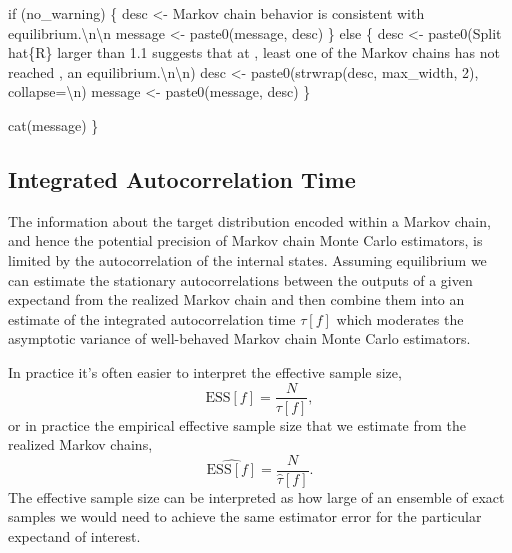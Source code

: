 \documentclass[
  letterpaper,
  DIV=11,
  numbers=noendperiod]{scrartcl}
\newenvironment{Shaded}{\begin{snugshade}}{\end{snugshade}}
\newcommand{\CharTok}[1]{\textcolor[rgb]{0.13,0.47,0.30}{#1}}
\newcommand{\ControlFlowTok}[1]{\textcolor[rgb]{0.00,0.23,0.31}{#1}}
\newcommand{\DecValTok}[1]{\textcolor[rgb]{0.68,0.00,0.00}{#1}}
\newcommand{\NormalTok}[1]{\textcolor[rgb]{0.00,0.23,0.31}{#1}}
\newcommand{\OperatorTok}[1]{\textcolor[rgb]{0.37,0.37,0.37}{#1}}
\newcommand{\SpecialCharTok}[1]{\textcolor[rgb]{0.37,0.37,0.37}{#1}}
\newcommand{\StringTok}[1]{\textcolor[rgb]{0.13,0.47,0.30}{#1}}
\begin{document}
\begin{Shaded}
\begin{Highlighting}[]
  \ControlFlowTok{if}\NormalTok{ (no\_warning) \{}
\NormalTok{    desc }\OperatorTok{\textless{}{-}} \StringTok{\textquotesingle{}Markov chain behavior is consistent with equilibrium.}\CharTok{\textbackslash{}n\textbackslash{}n}\StringTok{\textquotesingle{}}
\NormalTok{    message }\OperatorTok{\textless{}{-}}\NormalTok{ paste0(message, desc)}
\NormalTok{  \} }\ControlFlowTok{else}\NormalTok{ \{}
\NormalTok{    desc }\OperatorTok{\textless{}{-}}\NormalTok{ paste0(}\StringTok{\textquotesingle{}Split hat}\SpecialCharTok{\{R\}}\StringTok{ larger than 1.1 suggests that at \textquotesingle{}}\NormalTok{,}
                   \StringTok{\textquotesingle{}least one of the Markov chains has not reached \textquotesingle{}}\NormalTok{,}
                   \StringTok{\textquotesingle{}an equilibrium.}\CharTok{\textbackslash{}n\textbackslash{}n}\StringTok{\textquotesingle{}}\NormalTok{)}
\NormalTok{    desc }\OperatorTok{\textless{}{-}}\NormalTok{ paste0(strwrap(desc, max\_width, }\DecValTok{2}\NormalTok{), collapse}\OperatorTok{=}\StringTok{\textquotesingle{}}\CharTok{\textbackslash{}n}\StringTok{\textquotesingle{}}\NormalTok{)}
\NormalTok{    message }\OperatorTok{\textless{}{-}}\NormalTok{ paste0(message, desc)}
\NormalTok{  \}}
  
\NormalTok{  cat(message)}
\NormalTok{\}}
\end{Highlighting}
\end{Shaded}

\hypertarget{integrated-autocorrelation-time}{%
\subsection{Integrated Autocorrelation
Time}\label{integrated-autocorrelation-time}}

The information about the target distribution encoded within a Markov
chain, and hence the potential precision of Markov chain Monte Carlo
estimators, is limited by the autocorrelation of the internal states.
Assuming equilibrium we can estimate the stationary autocorrelations
between the outputs of a given expectand from the realized Markov chain
and then combine them into an estimate of the integrated autocorrelation
time \(\tau[f]\) which moderates the asymptotic variance of well-behaved
Markov chain Monte Carlo estimators.

In practice it's often easier to interpret the effective sample size, \[
\text{ESS}[f] = \frac{N}{\tau[f]},
\] or in practice the empirical effective sample size that we estimate
from the realized Markov chains, \[
\hat{\text{ESS}[f]} = \frac{N}{\hat{\tau}[f]}.
\] The effective sample size can be interpreted as how large of an
ensemble of exact samples we would need to achieve the same estimator
error for the particular expectand of interest.
\end{document}
